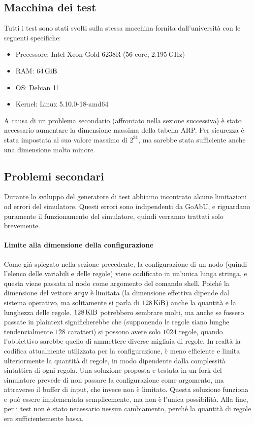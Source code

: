 \documentclass[12pt, a4paper]{article}
\begin{document}
\subsection{Macchina dei test}

Tutti i test sono stati svolti sulla stessa macchina fornita dall'università con le seguenti specifiche:

\begin{itemize}
    \item Precessore: Intel Xeon Gold 6238R ($56$ core, $\qty{2.195}{\giga\hertz}$)
    \item RAM: $\qty{64}{\gibi\byte}$
    \item OS: Debian 11
    \item Kernel: Linux 5.10.0-18-amd64
\end{itemize}

A causa di un problema secondario (affrontato nella sezione successiva) è stato necessario aumentare la dimensione massima della tabella ARP. Per sicurezza è stata impostata al suo valore massimo di $2^{31}$, ma sarebbe stata sufficiente anche una dimensione molto minore.

\subsection{Problemi secondari}

Durante lo sviluppo del generatore di test abbiamo incontrato alcune limitazioni od errori del simulatore. Questi errori sono indipendenti da GoAbU, e riguardano puramente il funzionamento del simulatore, quindi verranno trattati solo brevemente.

\paragraph{Limite alla dimensione della configurazione}

Come già spiegato nella sezione precedente, la configurazione di un nodo (quindi l'elenco delle variabili e delle regole) viene codificato in un'unica lunga stringa, e questa viene passata al nodo come argomento del comando shell. Poiché la dimensione del vettore \lstinline{argv} è limitata (la dimensione effettiva dipende dal sistema operativo, ma solitamente si parla di \ensuremath{\qty{128}{\kibi\byte}}) anche la quantità e la lunghezza delle regole.
\ensuremath{\qty{128}{\kibi\byte}} potrebbero sembrare molti, ma anche se fossero passate in plaintext significherebbe che (supponendo le regole siano lunghe tendenzialmente $128$ caratteri) si possono avere solo $1024$ regole, quando l'obbiettivo sarebbe quello di ammettere diverse migliaia di regole. In realtà la codifica attualmente utilizzata per la configurazione, è meno efficiente e limita ulteriormente la quantità di regole, in modo dipendente dalla complessità sintattica di ogni regola.
Una soluzione proposta e testata in un fork del simulatore prevede di non passare la configurazione come argomento, ma attraverso il buffer di input, che invece non è limitato. Questa soluzione funziona e può essere implementata semplicemente, ma non è l'unica possibilità.
Alla fine, per i test non è stato necessario nessun cambiamento, perché la quantità di regole era sufficientemente bassa.
\end{document}

